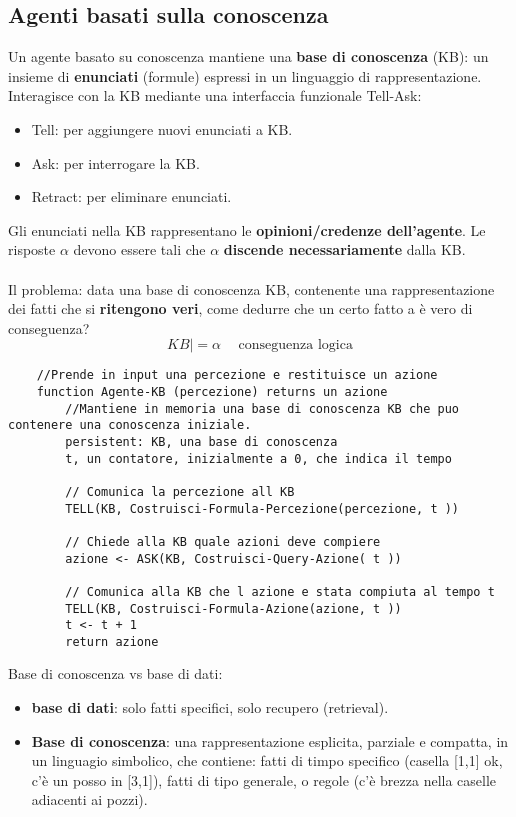 \subsection{Agenti basati sulla conoscenza}
Un agente basato su conoscenza mantiene una \textbf{base di conoscenza} (KB): un insieme di \textbf{enunciati} (formule) espressi in un
linguaggio di rappresentazione. Interagisce con la KB mediante una interfaccia funzionale Tell-Ask:
\begin{itemize}
    \item Tell: per aggiungere nuovi enunciati a KB.
    \item Ask: per interrogare la KB.
    \item Retract: per eliminare enunciati.
\end{itemize}
Gli enunciati nella KB rappresentano le \textbf{opinioni/credenze dell’agente}. Le risposte $\alpha$ devono
essere tali che $\alpha$ \textbf{discende necessariamente} dalla KB.\\\\
Il problema: data una base di conoscenza KB, contenente una rappresentazione dei fatti che si
\textbf{ritengono veri}, come dedurre che un certo fatto a è vero di conseguenza?
$$KB |= \alpha \hspace{15pt}\text{conseguenza logica}$$
\begin{lstlisting}
    //Prende in input una percezione e restituisce un azione
    function Agente-KB (percezione) returns un azione
        //Mantiene in memoria una base di conoscenza KB che puo contenere una conoscenza iniziale.
        persistent: KB, una base di conoscenza
        t, un contatore, inizialmente a 0, che indica il tempo

        // Comunica la percezione all KB
        TELL(KB, Costruisci-Formula-Percezione(percezione, t ))

        // Chiede alla KB quale azioni deve compiere
        azione <- ASK(KB, Costruisci-Query-Azione( t ))

        // Comunica alla KB che l azione e stata compiuta al tempo t
        TELL(KB, Costruisci-Formula-Azione(azione, t ))
        t <- t + 1
        return azione
\end{lstlisting}
Base di conoscenza vs base di dati:
\begin{itemize}
    \item \textbf{base di dati}: solo fatti specifici, solo recupero (retrieval).
    \item \textbf{Base di conoscenza}: una rappresentazione esplicita, parziale e compatta, in un linguagio simbolico, che contiene:
    fatti di timpo specifico (casella [1,1] ok, c'è un posso in [3,1]), fatti di tipo generale, o regole (c'è brezza nella caselle adiacenti ai pozzi).
\end{itemize}
